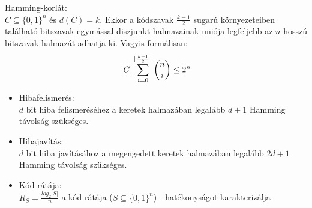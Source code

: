 \documentclass[margin=0px]{article}
\begin{document}
\begin{description}
\begin{itemize}
						Hamming-korlát: \\
						$ C \subseteq \{0,1\}^n$ és $d(C) = k$. Ekkor a kódszavak $\frac{k-1}{2}$ sugarú környezeteiben található bitszavak egymással diszjunkt halmazainak uniója legfeljebb az $n$-hosszú bitszavak halmazát adhatja ki. Vagyis formálisan:
						\begin{align*}
						|C|\sum_{i=0}^{\lfloor\frac{k-1}{2}\rfloor}\dbinom{n}{i} \leq 2^n
						\end{align*}
							
						\begin{itemize}
							\item Hibafelismerés: \\
								$d$ bit hiba felismeréséhez a keretek halmazában legalább $d+1$ Hamming távolság szükséges.
							
							\item Hibajavítás: \\
								$d$ bit hiba javításához a megengedett keretek halmazában legalább $2d+1$ Hamming távolság szükséges.
							
							\item Kód rátája: \\
								$R_S = \frac{log_2|S|}{n}$ a kód rátája ($S \subseteq \{0,1\}^n$) - hatékonyságot karakterizálja
							

\end{itemize}
\end{itemize}
\end{description}
\end{document}
